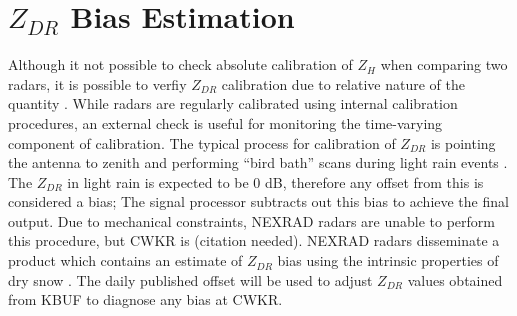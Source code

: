 \section{$Z_{DR}$ Bias Estimation}
Although it not possible to check absolute calibration of $Z_{H}$ when comparing two radars, it is possible to verfiy $Z_{DR}$ calibration due to relative nature of the quantity \citep{Zrnic2006}.
While radars are regularly calibrated using internal calibration procedures, an external check is useful for monitoring the time-varying component of calibration. The typical process for calibration of $Z_{DR}$ is pointing the antenna to zenith and performing ``bird bath'' scans during light rain events \citep{Hubbert2006}. The $Z_{DR}$ in light rain is expected to be 0 dB, therefore any offset from this is considered a bias; The signal processor subtracts out this bias to achieve the final output. Due to mechanical constraints, NEXRAD radars are unable to perform this procedure, but CWKR is (citation needed). NEXRAD radars disseminate a product which contains an estimate of $Z_{DR}$ bias using the intrinsic properties of dry snow \cite{Zittel2015}. The daily published offset will be used to adjust $Z_{DR}$ values obtained from KBUF to diagnose any bias at CWKR.



